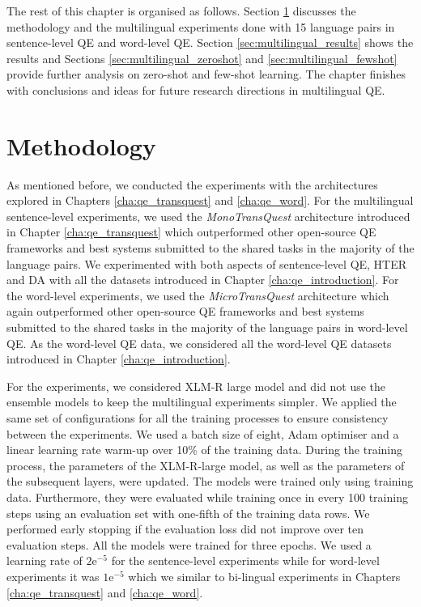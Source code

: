 The rest of this chapter is organised as follows. Section \ref{sec:multilingual_method} discusses the methodology and the multilingual experiments done with 15 language pairs in sentence-level QE and word-level QE.  Section \ref{sec:multilingual_results} shows the results and Sections \ref{sec:multilingual_zeroshot} and \ref{sec:multilingual_fewshot} provide further analysis on zero-shot and few-shot learning. The chapter finishes with conclusions and ideas for future research directions in multilingual QE.
 

\section{Methodology}
\label{sec:multilingual_method}
As mentioned before, we conducted the experiments with the architectures explored in Chapters \ref{cha:qe_transquest} and \ref{cha:qe_word}. For the multilingual sentence-level experiments, we used the \textit{MonoTransQuest} architecture introduced in Chapter \ref{cha:qe_transquest} which outperformed other open-source QE frameworks and best systems submitted to the shared tasks in the majority of the language pairs. We experimented with both aspects of sentence-level QE, HTER and DA with all the datasets introduced in Chapter \ref{cha:qe_introduction}. For the word-level experiments, we used the \textit{MicroTransQuest} architecture which again outperformed other open-source QE frameworks and best systems submitted to the shared tasks in the majority of the language pairs in word-level QE. As the word-level QE data, we considered all the word-level QE datasets introduced in Chapter \ref{cha:qe_introduction}.

For the experiments, we considered XLM-R large model and did not use the ensemble models to keep the multilingual experiments simpler. We applied the same set of configurations for all the training processes to ensure consistency between the experiments. We used a batch size of eight, Adam optimiser and a linear learning rate warm-up over 10\% of the training data. During the training process, the parameters of the XLM-R-large model, as well as the parameters of the subsequent layers, were updated. The models were trained only using training data. Furthermore, they were evaluated while training once in every 100 training steps using an evaluation set with one-fifth of the training data rows. We performed early stopping if the evaluation loss did not improve over ten evaluation steps. All the models were trained for three epochs. We used a learning rate of $2\mathrm{e}^{-5}$ for the sentence-level experiments while for word-level experiments it was $1\mathrm{e}^{-5}$ which we similar to bi-lingual experiments in Chapters \ref{cha:qe_transquest} and \ref{cha:qe_word}.



